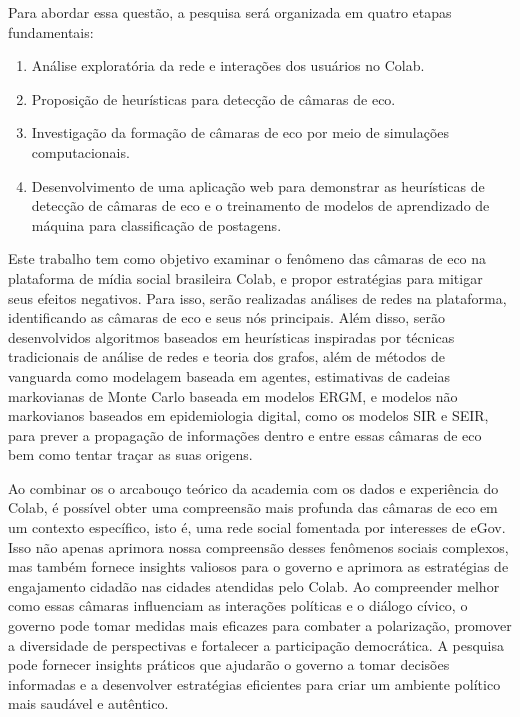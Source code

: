 Para abordar essa questão, a pesquisa será organizada em quatro etapas fundamentais:

\begin{enumerate}
    \item Análise exploratória da rede e interações dos usuários no Colab.
    \item Proposição de heurísticas para detecção de câmaras de eco.
    \item Investigação da formação de câmaras de eco por meio de simulações computacionais.
    \item Desenvolvimento de uma aplicação web para demonstrar as heurísticas de detecção de câmaras de eco e o treinamento de modelos de aprendizado de máquina para classificação de postagens.
  \end{enumerate}

Este trabalho tem como objetivo examinar o fenômeno das câmaras de eco na plataforma de mídia social brasileira Colab, e propor estratégias para mitigar seus efeitos negativos. Para isso, serão realizadas análises de redes na plataforma, identificando as câmaras de eco e seus nós principais. Além disso, serão desenvolvidos algoritmos baseados em heurísticas inspiradas por técnicas tradicionais de análise de redes e teoria dos grafos, além de métodos de vanguarda como modelagem baseada em agentes, estimativas de cadeias markovianas de Monte Carlo baseada em modelos ERGM, e modelos não markovianos baseados em epidemiologia digital, como os modelos SIR e SEIR, para prever a propagação de informações dentro e entre essas câmaras de eco bem como tentar traçar as suas origens.

Ao combinar os o arcabouço teórico da academia com os dados e experiência do Colab, é possível obter uma compreensão mais profunda das câmaras de eco em um contexto específico, isto é, uma rede social fomentada por interesses  de eGov. Isso não apenas aprimora nossa compreensão desses fenômenos sociais complexos, mas também fornece insights valiosos para o governo e aprimora as estratégias de engajamento cidadão nas cidades atendidas pelo Colab. Ao compreender melhor como essas câmaras influenciam as interações políticas e o diálogo cívico, o governo pode tomar medidas mais eficazes para combater a polarização, promover a diversidade de perspectivas e fortalecer a participação democrática. A pesquisa pode fornecer insights práticos que ajudarão o governo a tomar decisões informadas e a desenvolver estratégias eficientes para criar um ambiente político mais saudável e autêntico.